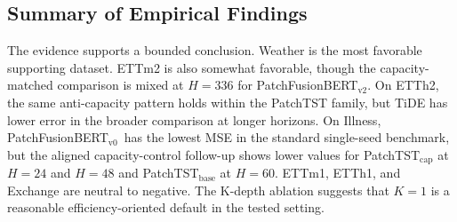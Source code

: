 \documentclass{ieeeaccess}
\newcommand{\modelvzero}{PatchFusionBERT$_{\text{v0}}$\xspace}
\newcommand{\modelvtwo}{PatchFusionBERT$_{\text{v2}}$\xspace}
\begin{document}
\subsection{Summary of Empirical Findings}
The evidence supports a bounded conclusion. Weather is the most favorable supporting
dataset. ETTm2 is also somewhat favorable, though the capacity-matched comparison is mixed at
$H=336$ for \modelvtwo. On ETTh2, the same anti-capacity pattern holds within the
PatchTST family, but TiDE has lower error in the broader comparison at longer horizons. On
Illness, \modelvzero\ has the lowest MSE in the standard single-seed benchmark, but the aligned
capacity-control follow-up shows lower values for PatchTST$_\text{cap}$ at $H=24$ and $H=48$ and
PatchTST$_\text{base}$ at $H=60$. ETTm1, ETTh1, and Exchange are neutral to negative.
The K-depth ablation suggests that $K=1$ is a reasonable efficiency-oriented default in the tested setting.
\end{document}

